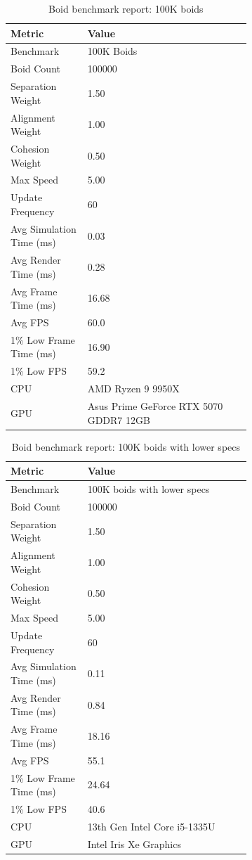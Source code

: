 \documentclass[a4paper, 12pt]{article}
\begin{document}
\begin{table}[htbp]
\centering
{}
\begin{tabular}{l p{0.68\linewidth}}
\hline
Metric & Value \\
\hline
Benchmark &  100K Boids\\
Boid Count & 100000 \\
Separation Weight & 1.50 \\
Alignment Weight & 1.00 \\
Cohesion Weight & 0.50 \\
Max Speed & 5.00 \\
Update Frequency & 60 \\
Avg Simulation Time (ms) & 0.03 \\
Avg Render Time (ms) & 0.28 \\
Avg Frame Time (ms) & 16.68 \\
Avg FPS & 60.0 \\
1\% Low Frame Time (ms) & 16.90 \\
1\% Low FPS & 59.2 \\
CPU & AMD Ryzen 9 9950X \\
GPU & Asus Prime GeForce RTX 5070 GDDR7 12GB\\
\hline
\end{tabular}
\caption{Boid benchmark report: 100K boids}
\label{tab:boid-benchmark-report-100k-standard}
\end{table}


\begin{table}[htbp]
\centering
{}
\begin{tabular}{l p{0.68\linewidth}}
\hline
Metric & Value \\
\hline
Benchmark & 100K boids with lower specs \\
Boid Count & 100000 \\
Separation Weight & 1.50 \\
Alignment Weight & 1.00 \\
Cohesion Weight & 0.50 \\
Max Speed & 5.00 \\
Update Frequency & 60 \\
Avg Simulation Time (ms) & 0.11 \\
Avg Render Time (ms) & 0.84 \\
Avg Frame Time (ms) & 18.16 \\
Avg FPS & 55.1 \\
1\% Low Frame Time (ms) & 24.64 \\
1\% Low FPS & 40.6 \\
CPU & 13th Gen Intel Core i5-1335U \\
GPU & Intel Iris Xe Graphics \\
\hline
\end{tabular}
\caption{Boid benchmark report: 100K boids with lower specs}
\label{tab:boid-benchmark-report-100k-weak}
\end{table}
\end{document}
